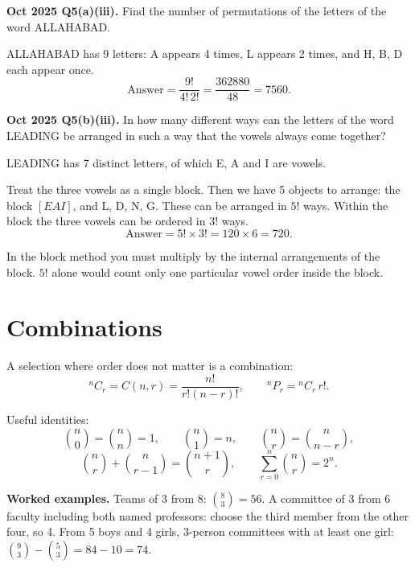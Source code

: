 \documentclass[11pt,a4paper]{article}
\begin{document}
\begin{pyqbox}
\textbf{Oct 2025 Q5(a)(iii).} Find the number of permutations of the letters of the word ALLAHABAD.
\end{pyqbox}

\begin{solbox}
ALLAHABAD has 9 letters: A appears 4 times, L appears 2 times, and H, B, D each appear once.
\[
\text{Answer}=\frac{9!}{4!\,2!}=\frac{362880}{48}=\boxed{7560}.
\]
\end{solbox}

\begin{pyqbox}
\textbf{Oct 2025 Q5(b)(iii).} In how many different ways can the letters of the word LEADING be arranged in such a way that the vowels always come together?
\end{pyqbox}

\begin{solbox}
LEADING has 7 distinct letters, of which E, A and I are vowels.

Treat the three vowels as a single block. Then we have 5 objects to arrange: the block $[EAI]$, and L, D, N, G. These can be arranged in $5!$ ways. Within the block the three vowels can be ordered in $3!$ ways.
\[
\text{Answer}=5!\times3!=120\times6=\boxed{720}.
\]
\end{solbox}

\begin{dangerbox}
In the block method you must multiply by the internal arrangements of the block. $5!$ alone would count only one particular vowel order inside the block.
\end{dangerbox}

\section{Combinations}

A selection where order does not matter is a combination:
\[
{}^nC_r=C(n,r)=\frac{n!}{r!(n-r)!},\qquad {}^nP_r={}^nC_r\,r!.
\]

Useful identities:
\[
\binom n0=\binom nn=1,\qquad \binom n1=n,\qquad \binom nr=\binom n{n-r},
\]
\[
\binom nr+\binom n{r-1}=\binom{n+1}r,\qquad \sum_{r=0}^n\binom nr=2^n.
\]

\begin{exambox}
\textbf{Worked examples.} Teams of 3 from 8: $\binom83=56$. A committee of 3 from 6 faculty including both named professors: choose the third member from the other four, so 4. From 5 boys and 4 girls, 3-person committees with at least one girl: $\binom93-\binom53=84-10=74$.
\end{exambox}
\end{document}
